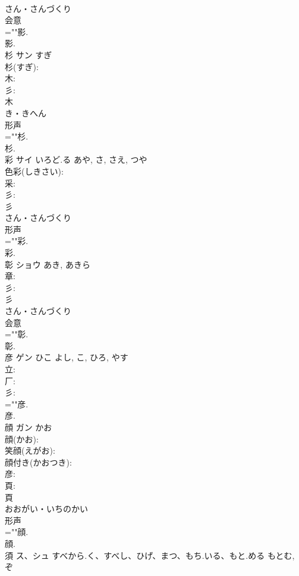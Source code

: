 \documentclass[8pt]{extreport}
\begin{document}
\begin{CJK}{UTF8}{min}
\\	さん・さんづくり	
\\	会意 
\\	=""影.
\\	影.
\\	杉	サン	すぎ		
\\	杉(すぎ): 
\\	木: 
\\	彡: 
\\	木	
\\	き・きへん	
\\	形声 
\\	=""杉.
\\	杉.
\\	彩	サイ	いろど.る	あや, さ, さえ, つや	
\\	色彩(しきさい): 
\\	采: 
\\	彡: 
\\	彡	
\\	さん・さんづくり	
\\	形声 
\\	=""彩.
\\	彩.
\\	彰	ショウ		あき, あきら	
\\	章: 
\\	彡: 
\\	彡	
\\	さん・さんづくり	
\\	会意 
\\	=""彰.
\\	彰.
\\	彦	ゲン	ひこ	よし, こ, ひろ, やす	
\\	立: 
\\	厂: 
\\	彡: 
\\	=""彦.
\\	彦.
\\	顔	ガン	かお		
\\	顔(かお): 
\\	笑顔(えがお): 
\\	顔付き(かおつき): 
\\	彦: 
\\	頁: 
\\	頁	
\\	おおがい・いちのかい	
\\	形声 
\\	=""顔.
\\	顔.
\\	須	ス、シュ	すべから.く、すべし、ひげ、まつ、もち.いる、もと.める	もとむ, ぞ	

\end{CJK}
\end{document}
